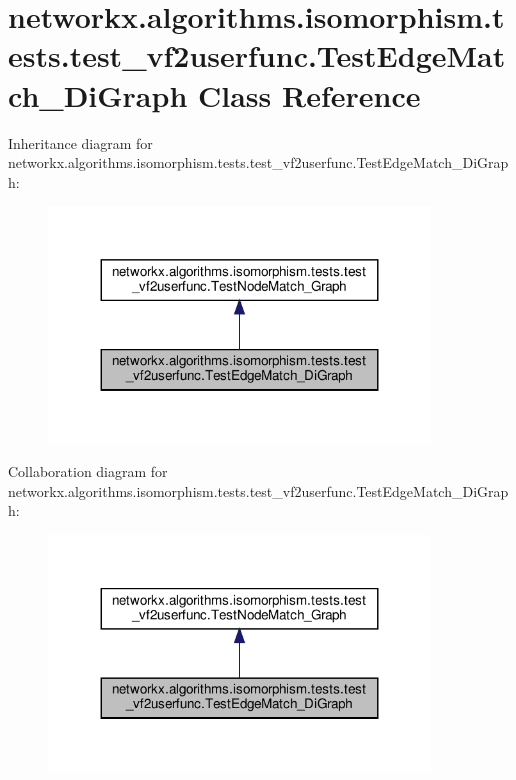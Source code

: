 \hypertarget{classnetworkx_1_1algorithms_1_1isomorphism_1_1tests_1_1test__vf2userfunc_1_1TestEdgeMatch__DiGraph}{}\section{networkx.\+algorithms.\+isomorphism.\+tests.\+test\+\_\+vf2userfunc.\+Test\+Edge\+Match\+\_\+\+Di\+Graph Class Reference}
\label{classnetworkx_1_1algorithms_1_1isomorphism_1_1tests_1_1test__vf2userfunc_1_1TestEdgeMatch__DiGraph}


Inheritance diagram for networkx.\+algorithms.\+isomorphism.\+tests.\+test\+\_\+vf2userfunc.\+Test\+Edge\+Match\+\_\+\+Di\+Graph\+:
\nopagebreak
\begin{figure}[H]
\begin{center}
\leavevmode
\includegraphics[width=287pt]{classnetworkx_1_1algorithms_1_1isomorphism_1_1tests_1_1test__vf2userfunc_1_1TestEdgeMatch__DiGraph__inherit__graph}
\end{center}
\end{figure}


Collaboration diagram for networkx.\+algorithms.\+isomorphism.\+tests.\+test\+\_\+vf2userfunc.\+Test\+Edge\+Match\+\_\+\+Di\+Graph\+:
\nopagebreak
\begin{figure}[H]
\begin{center}
\leavevmode
\includegraphics[width=287pt]{classnetworkx_1_1algorithms_1_1isomorphism_1_1tests_1_1test__vf2userfunc_1_1TestEdgeMatch__DiGraph__coll__graph}
\end{center}
\end{figure}
